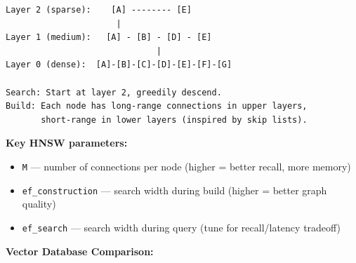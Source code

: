\documentclass[11pt]{article}
\providecommand{\tightlist}{\setlength{\itemsep}{1pt}\setlength{\parskip}{0pt}}
\begin{document}
\setcodelang{}

\begin{verbatim}
Layer 2 (sparse):    [A] -------- [E]
                      |
Layer 1 (medium):   [A] - [B] - [D] - [E]
                              |
Layer 0 (dense):  [A]-[B]-[C]-[D]-[E]-[F]-[G]

Search: Start at layer 2, greedily descend.
Build: Each node has long-range connections in upper layers,
       short-range in lower layers (inspired by skip lists).
\end{verbatim}

\textbf{Key HNSW parameters:}

\begin{itemize}
\tightlist
\item
  \texttt{M} --- number of connections per node (higher = better recall, more memory)
\item
  \texttt{ef\_construction} --- search width during build (higher = better graph quality)
\item
  \texttt{ef\_search} --- search width during query (tune for recall/latency tradeoff)
\end{itemize}

\textbf{Vector Database Comparison:}
\end{document}
